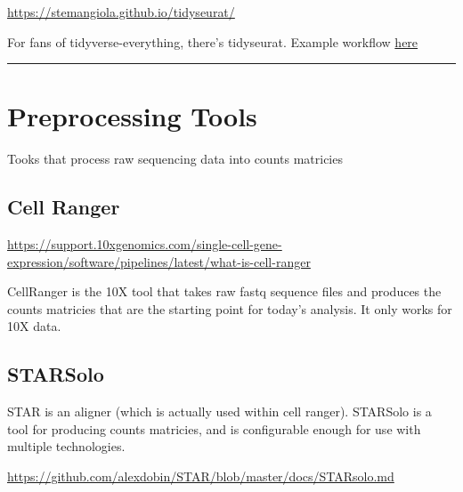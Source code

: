 \documentclass[
]{book}
\begin{document}
\url{https://stemangiola.github.io/tidyseurat/}

For fans of tidyverse-everything, there's tidyseurat. Example workflow \href{https://tidytranscriptomics-workshops.github.io/bioc2022_tidytranscriptomics/articles/tidytranscriptomics_case_study.html}{here}

\begin{center}\rule{0.5\linewidth}{0.5pt}\end{center}

\hypertarget{preprocessing-tools}{%
\section{Preprocessing Tools}\label{preprocessing-tools}}

Tooks that process raw sequencing data into counts matricies

\hypertarget{cell-ranger}{%
\subsection*{Cell Ranger}\label{cell-ranger}}

\url{https://support.10xgenomics.com/single-cell-gene-expression/software/pipelines/latest/what-is-cell-ranger}

CellRanger is the 10X tool that takes raw fastq sequence files and produces the counts matricies that are the starting point for today's analysis. It only works for 10X data.

\hypertarget{starsolo}{%
\subsection*{STARSolo}\label{starsolo}}

STAR is an aligner (which is actually used within cell ranger). STARSolo is a tool for producing counts matricies, and is configurable enough for use with multiple technologies.

\url{https://github.com/alexdobin/STAR/blob/master/docs/STARsolo.md}

  
\end{document}
